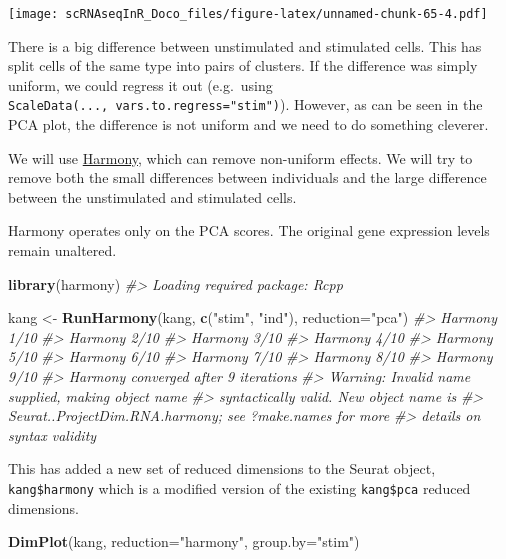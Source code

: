 \documentclass[
]{book}
\newenvironment{Shaded}{\begin{snugshade}}{\end{snugshade}}
\newcommand{\AttributeTok}[1]{\textcolor[rgb]{0.13,0.29,0.53}{#1}}
\newcommand{\CommentTok}[1]{\textcolor[rgb]{0.56,0.35,0.01}{\textit{#1}}}
\newcommand{\FunctionTok}[1]{\textcolor[rgb]{0.13,0.29,0.53}{\textbf{#1}}}
\newcommand{\NormalTok}[1]{#1}
\newcommand{\OtherTok}[1]{\textcolor[rgb]{0.56,0.35,0.01}{#1}}
\newcommand{\StringTok}[1]{\textcolor[rgb]{0.31,0.60,0.02}{#1}}
\begin{document}
\texttt{[image: scRNAseqInR\_Doco\_files/figure-latex/unnamed-chunk-65-4.pdf]}

There is a big difference between unstimulated and stimulated cells. This has split cells of the same type into pairs of clusters. If the difference was simply uniform, we could regress it out (e.g.~using \texttt{ScaleData(...,\ vars.to.regress="stim")}). However, as can be seen in the PCA plot, the difference is not uniform and we need to do something cleverer.

We will use \href{https://github.com/immunogenomics/harmony}{Harmony}, which can remove non-uniform effects. We will try to remove both the small differences between individuals and the large difference between the unstimulated and stimulated cells.

Harmony operates only on the PCA scores. The original gene expression levels remain unaltered.

\begin{Shaded}
\begin{Highlighting}[]
\FunctionTok{library}\NormalTok{(harmony)}
\CommentTok{\#\textgreater{} Loading required package: Rcpp}

\NormalTok{kang }\OtherTok{\textless{}{-}} \FunctionTok{RunHarmony}\NormalTok{(kang, }\FunctionTok{c}\NormalTok{(}\StringTok{"stim"}\NormalTok{, }\StringTok{"ind"}\NormalTok{), }\AttributeTok{reduction=}\StringTok{"pca"}\NormalTok{)}
\CommentTok{\#\textgreater{} Harmony 1/10}
\CommentTok{\#\textgreater{} Harmony 2/10}
\CommentTok{\#\textgreater{} Harmony 3/10}
\CommentTok{\#\textgreater{} Harmony 4/10}
\CommentTok{\#\textgreater{} Harmony 5/10}
\CommentTok{\#\textgreater{} Harmony 6/10}
\CommentTok{\#\textgreater{} Harmony 7/10}
\CommentTok{\#\textgreater{} Harmony 8/10}
\CommentTok{\#\textgreater{} Harmony 9/10}
\CommentTok{\#\textgreater{} Harmony converged after 9 iterations}
\CommentTok{\#\textgreater{} Warning: Invalid name supplied, making object name}
\CommentTok{\#\textgreater{} syntactically valid. New object name is}
\CommentTok{\#\textgreater{} Seurat..ProjectDim.RNA.harmony; see ?make.names for more}
\CommentTok{\#\textgreater{} details on syntax validity}
\end{Highlighting}
\end{Shaded}

This has added a new set of reduced dimensions to the Seurat object, \texttt{kang\$harmony} which is a modified version of the existing \texttt{kang\$pca} reduced dimensions.

\begin{Shaded}
\begin{Highlighting}[]
\FunctionTok{DimPlot}\NormalTok{(kang, }\AttributeTok{reduction=}\StringTok{"harmony"}\NormalTok{, }\AttributeTok{group.by=}\StringTok{"stim"}\NormalTok{)}
\end{Highlighting}
\end{Shaded}
\end{document}
